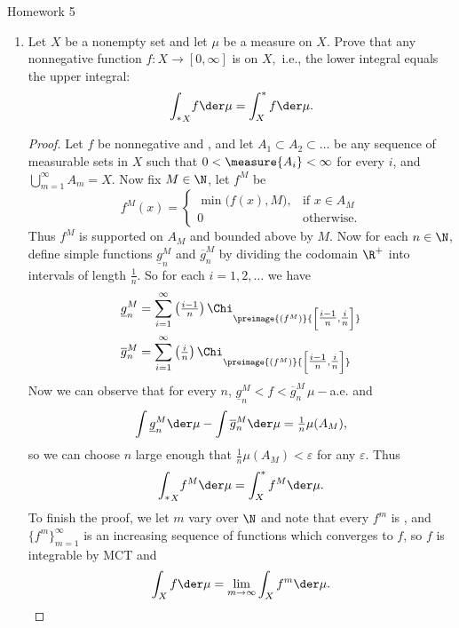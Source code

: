 \documentclass[12pt,letterpaper]{article}
\begin{document}
\pagestyle{fancy}
\begin{center}
{\Large Homework 5}%
\end{center}

\begin{enumerate}
\item Let $X$ be a nonempty set and let $\mu$ be a measure on $X$. Prove that any nonnegative \mumeasurable{} function $f : X \to [0, \infty]$ is \muintegrable{} on $X,$ i.e., the lower integral equals the upper integral:
$${\int_*}_X f \der \mu = \int^*_X f \der \mu .$$
\begin{proof}
Let $f$ be nonnegative and \mumeasurable{}, and let $A_1\subset A_2\subset\dots$ be any sequence of measurable sets in $X$ such that $0<\measure{A_i}<\infty$ for every $i$, and $\bigcup_{m=1}^\infty A_m=X$\footnotemark. Now fix $M\in\N$, let $f^M$ be 
\[
f^M(x) = \begin{cases}
	\min\big(f(x),M\big), & \text{if } x\in A_M\\
	0 & \text{otherwise.}
\end{cases}
\]
Thus $f^M$ is supported on $A_M$ and bounded above by $M$. Now for each $n\in\N$, define simple functions $\underline{g}^M_n$ and $\overline{g}^M_n$ by dividing the codomain $\R^+$ into intervals of length $\frac{1}{n}$. So for each $i= 1, 2, \dots$ we have 
\begin{align*}
\underline{g}^M_n&=\sum_{i=1}^\infty \left(\tfrac{i-1}{n}\right) \Chi_{\preimage{(f^M)}{\left[\tfrac{i-1}{n},\tfrac{i}{n}\right]}} \\
\overline{g}^M_n&=\sum_{i=1}^\infty \left(\tfrac{i}{n}\right) \Chi_{\preimage{(f^M)}{\left[\tfrac{i-1}{n},\tfrac{i}{n}\right]}}
\end{align*}
Now we can observe that for every $n$, $\underline{g}^M_n<f<\overline{g}^M_n \, \mu-$a.e. and $$\int\underline{g}^M_n \der\mu - \int\overline{g}^M_n\der\mu=\tfrac{1}{n}\mu(A_M),$$
so we can choose $n$ large enough that $\tfrac{1}{n}\mu(A_M)<\varepsilon$ for any $\varepsilon$. Thus 
$${\int_*}_X f^M \der \mu = \int^*_X f^M \der \mu .$$
To finish the proof, we let $m$ vary over $\N$ and note that every $f^m$ is \muintegrable{}, and $\{f^m\}_{m=1}^\infty$ is an increasing sequence of functions which converges to $f$, so $f$ is integrable by MCT and 
$$\int_X f\der \mu = \lim_{m \to\infty} \int_X f^m \der\mu.$$
\end{proof}


\end{enumerate}
\end{document}
